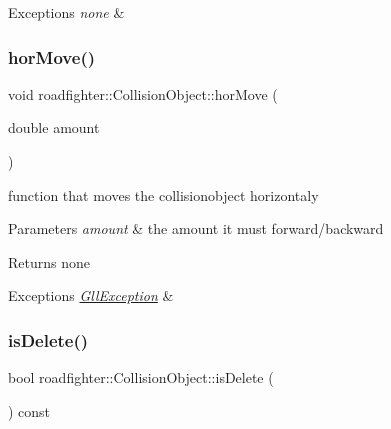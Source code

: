 \begin{DoxyExceptions}{Exceptions}
{\em none} & \\
\hline
\end{DoxyExceptions}
\mbox{\label{classroadfighter_1_1CollisionObject_a907fbb9f4a45996690b4f35bc4256e47}} 
\subsubsection{\texorpdfstring{hor\+Move()}{horMove()}}
{\footnotesize\ttfamily void roadfighter\+::\+Collision\+Object\+::hor\+Move (\begin{DoxyParamCaption}\item[{double}]{amount }\end{DoxyParamCaption})}

function that moves the collisionobject horizontaly 
\begin{DoxyParams}{Parameters}
{\em amount} & the amount it must forward/backward \\
\hline
\end{DoxyParams}
\begin{DoxyReturn}{Returns}
none 
\end{DoxyReturn}

\begin{DoxyExceptions}{Exceptions}
{\em \hyperlink{classroadfighter_1_1GllException}{Gll\+Exception}} & \\
\hline
\end{DoxyExceptions}
\mbox{\label{classroadfighter_1_1CollisionObject_a2891183d9769adbc9a9c0dc65db1af10}} 
\subsubsection{\texorpdfstring{is\+Delete()}{isDelete()}}
{\footnotesize\ttfamily bool roadfighter\+::\+Collision\+Object\+::is\+Delete (\begin{DoxyParamCaption}{ }\end{DoxyParamCaption}) const}

